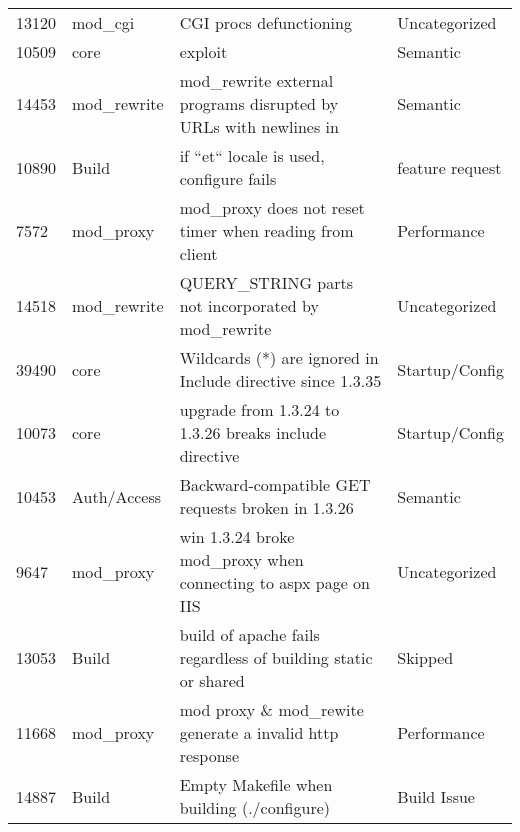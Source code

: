 \begin{longtable}[c]{llll}
13120  & mod\_cgi           & CGI procs defunctioning                                                                                        & Uncategorized     \\
10509  & core               & exploit                                                                                                        & Semantic          \\
14453  & mod\_rewrite       & mod\_rewrite external programs disrupted by URLs with newlines in                                              & Semantic          \\
10890  & Build              & if ``et`` locale is used, configure fails                                                                        & feature request   \\
7572   & mod\_proxy         & mod\_proxy does not reset timer when reading from client                                                       & Performance       \\
14518  & mod\_rewrite       & QUERY\_STRING parts not incorporated by mod\_rewrite                                                           & Uncategorized     \\
39490  & core               & Wildcards (*) are ignored in Include directive since 1.3.35                                                    & Startup/Config    \\
10073  & core               & upgrade from 1.3.24 to 1.3.26 breaks include directive                                                         & Startup/Config    \\
10453  & Auth/Access        & Backward-compatible GET requests broken in 1.3.26                                                              & Semantic          \\
9647   & mod\_proxy         & win 1.3.24 broke mod\_proxy when connecting to aspx page on IIS                                                & Uncategorized     \\
13053  & Build              & build of apache fails regardless of building static or shared                                                  & Skipped           \\
11668  & mod\_proxy         & mod proxy \& mod\_rewite generate a invalid http response                                                      & Performance       \\
14887  & Build              & Empty Makefile when building (./configure)                                                                     & Build Issue       \\

\end{longtable}
